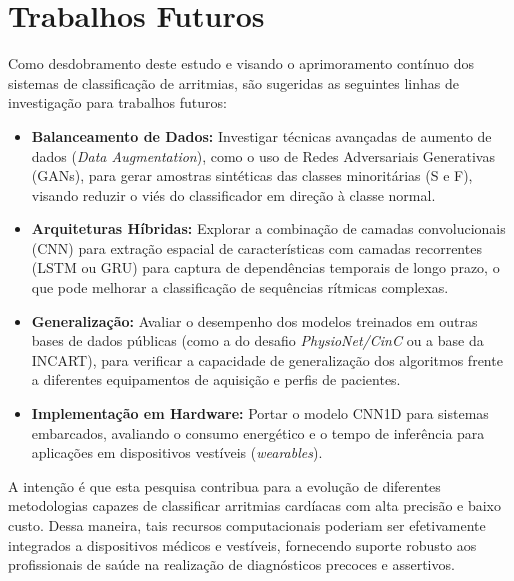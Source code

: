 \section{Trabalhos Futuros}

Como desdobramento deste estudo e visando o aprimoramento contínuo dos sistemas de classificação de arritmias, são sugeridas as seguintes linhas de 
investigação para trabalhos futuros:

\begin{itemize}
    \item \textbf{Balanceamento de Dados:} Investigar técnicas avançadas de aumento de dados (\textit{Data Augmentation}), como o uso de Redes 
    Adversariais Generativas (GANs), para gerar amostras sintéticas das classes minoritárias (S e F), visando reduzir o viés do classificador em 
    direção à classe normal.
    
    \item \textbf{Arquiteturas Híbridas:} Explorar a combinação de camadas convolucionais (CNN) para extração espacial de características com camadas 
    recorrentes (LSTM ou GRU) para captura de dependências temporais de longo prazo, o que pode melhorar a classificação de sequências rítmicas complexas.
    
    \item \textbf{Generalização:} Avaliar o desempenho dos modelos treinados em outras bases de dados públicas (como a do desafio \textit{PhysioNet/CinC} 
    ou a base da INCART), para verificar a capacidade de generalização dos algoritmos frente a diferentes equipamentos de aquisição e perfis de pacientes.
    
    \item \textbf{Implementação em Hardware:} Portar o modelo CNN1D para sistemas embarcados, 
    avaliando o consumo energético e o tempo de inferência para aplicações em dispositivos vestíveis (\textit{wearables}).

\end{itemize}

A intenção é que esta pesquisa contribua para a evolução de diferentes metodologias capazes de classificar arritmias cardíacas com alta precisão e 
baixo custo. Dessa maneira, tais recursos computacionais poderiam ser efetivamente integrados a dispositivos médicos e vestíveis, fornecendo suporte 
robusto aos profissionais de saúde na realização de diagnósticos precoces e assertivos.